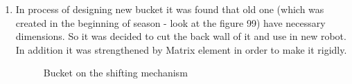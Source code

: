 \begin{enumerate}
   \item In process of designing new bucket it was found that old one (which was created in the beginning of season - look at the figure 99) have necessary dimensions. So it was decided to cut the back wall of it and use in new robot. In addition it was strengthened by Matrix element in order to make it rigidly.
   \begin{center}
     \begin{figure}[H]
     	\begin{minipage}[h]{\linewidth}
     		\caption{Bucket on the shifting mechanism}
     	\end{minipage} 
     \end{figure}
   \end{center}
   

\end{enumerate}
